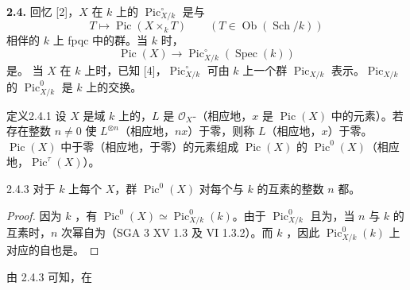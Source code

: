 \textbf{2.4.} 回忆 [2]，$X$ 在 $k$ 上的  $\operatorname{Pic}^{\circ}_{X/k}$ 是与
\[T\longmapsto\operatorname{Pic}(X\times_kT)\qquad(T\in\operatorname{Ob}(\operatorname{Sch}/k))\]
相伴的 $k$ 上 fpqc 中的群。当 $k$ 时，
\[\operatorname{Pic}(X)\longrightarrow\operatorname{Pic}^{\circ}_{X/k}(\operatorname{Spec}(k))\]
是。
当 $X$ 在 $k$ 上时，已知 [4]，$\operatorname{Pic}^{\circ}_{X/k}$ 可由 $k$ 上一个群 $\operatorname{Pic}_{X/k}$ 表示。$\operatorname{Pic}_{X/k}$ 的 $\operatorname{Pic}^0_{X/k}$ 是 $k$ 上的交换。
\begin{SGAresult}{定义}{2.4.1}
设 $X$ 是域 $k$ 上的，$L$ 是 $\mathcal O_X$-（相应地，$x$ 是 $\operatorname{Pic}(X)$ 中的元素）。若存在整数 $n\ne0$ 使 $L^{\otimes n}$（相应地，$nx$）于零，则称 $L$（相应地，$x$）于零。$\operatorname{Pic}(X)$ 中于零（相应地，于零）的元素组成 $\operatorname{Pic}(X)$ 的 $\operatorname{Pic}^0(X)$（相应地，$\operatorname{Pic}^\tau(X)$）。
\end{SGAresult}
\begin{SGAresult}{}{2.4.3}
对于 $k$ 上每个 $X$，群 $\operatorname{Pic}^0(X)$ 对每个与 $k$ 的互素的整数 $n$ 都。
\end{SGAresult}
\begin{proof}
因为 $k$ ，有 $\operatorname{Pic}^0(X)\simeq\operatorname{Pic}^0_{X/k}(k)$。由于 $\operatorname{Pic}^0_{X/k}$ 且为，当 $n$ 与 $k$ 的互素时，$n$ 次幂自为（SGA 3 XV 1.3 及 VI 1.3.2）。而 $k$ ，因此 $\operatorname{Pic}^0_{X/k}(k)$ 上对应的自也是。
\end{proof}
由 2.4.3 可知，在
